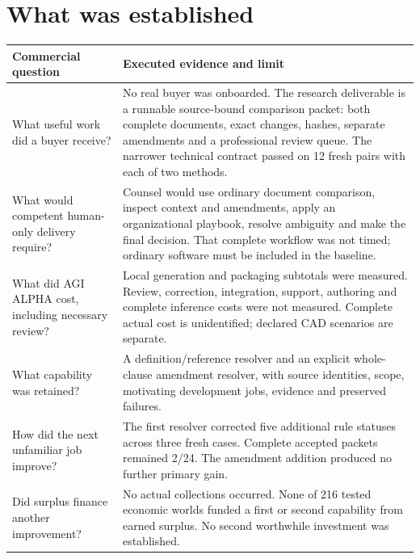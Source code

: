 \documentclass[10pt,a4paper]{article}
\begin{document}
\section*{What was established}
\begin{tabularx}{\textwidth}{@{}>{\raggedright\arraybackslash}p{}Y@{}}
\toprule
\textbf{Commercial question} & \textbf{Executed evidence and limit}\\
\midrule
What useful work did a buyer receive? & No real buyer was onboarded. The research deliverable is a runnable source-bound comparison packet: both complete documents, exact changes, hashes, separate amendments and a professional review queue. The narrower technical contract passed on 12 fresh pairs with each of two methods.\\
What would competent human-only delivery require? & Counsel would use ordinary document comparison, inspect context and amendments, apply an organizational playbook, resolve ambiguity and make the final decision. That complete workflow was not timed; ordinary software must be included in the baseline.\\
What did AGI ALPHA cost, including necessary review? & Local generation and packaging subtotals were measured. Review, correction, integration, support, authoring and complete inference costs were not measured. Complete actual cost is unidentified; declared CAD scenarios are separate.\\
What capability was retained? & A definition/reference resolver and an explicit whole-clause amendment resolver, with source identities, scope, motivating development jobs, evidence and preserved failures.\\
How did the next unfamiliar job improve? & The first resolver corrected five additional rule statuses across three fresh cases. Complete accepted packets remained 2/24. The amendment addition produced no further primary gain.\\
Did surplus finance another improvement? & No actual collections occurred. None of 216 tested economic worlds funded a first or second capability from earned surplus. No second worthwhile investment was established.\\
\bottomrule
\end{tabularx}
\end{document}

